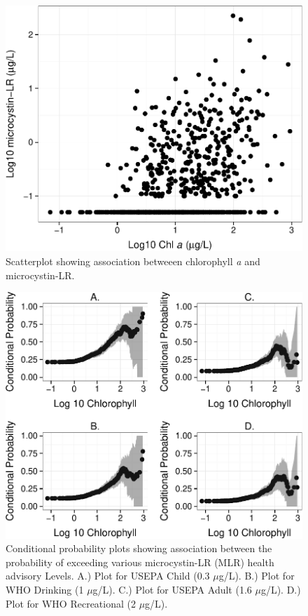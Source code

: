 \documentclass[11pt,]{article}
\begin{document}
\begin{figure}[htbp]
\centering
\includegraphics{manuscript_files/figure-latex/chla_micro_scatter-1.pdf}
\caption{Scatterplot showing association betweeen chlorophyll \textit{a}
and microcystin-LR. \label{fig:chla_micro_scatter}}
\end{figure}

\newpage

\begin{figure}[htbp]
\centering
\includegraphics{manuscript_files/figure-latex/epa_child_cp_plot-1.pdf}
\caption{Conditional probability plots showing association between the
probability of exceeding various microcystin-LR (MLR) health advisory
Levels. A.) Plot for USEPA Child (0.3 \(\mu\)g/L). B.) Plot for WHO
Drinking (1 \(\mu\)g/L). C.) Plot for USEPA Adult (1.6 \(\mu\)g/L). D.)
Plot for WHO Recreational (2 \(\mu\)g/L). \label{fig:multi_cp_plot}}
\end{figure}
\end{document}
